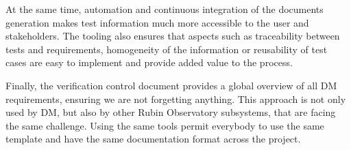 At the same time, automation and continuous integration of the documents generation makes test information
much more accessible to the user and stakeholders.
The tooling also ensures that aspects such as traceability between tests and requirements, homogeneity of the information
or reusability of test cases are easy to implement and provide added value to the process.

Finally, the verification control document provides a global overview of all DM requirements, ensuring we are not forgetting anything.
This approach is not only used by DM, but also by other Rubin Observatory subsystems, that are facing the same challenge.
Using the same tools permit everybody to use the same template and have the same documentation format across the project.



